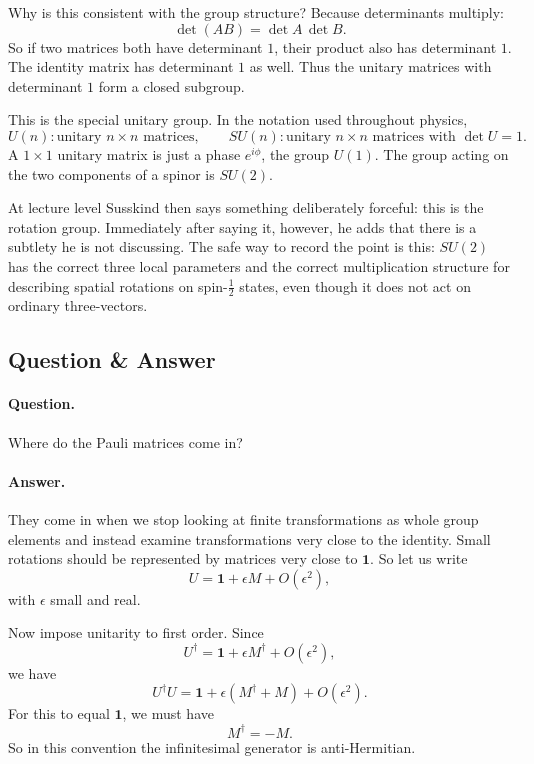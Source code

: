 Why is this consistent with the group structure? Because determinants multiply:
\begin{equation}
\det(AB)=\det A\,\det B.
\end{equation}
So if two matrices both have determinant \(1\), their product also has determinant \(1\). The identity matrix has determinant \(1\) as well. Thus the unitary matrices with determinant \(1\) form a closed subgroup.

This is the special unitary group. In the notation used throughout physics,
\begin{equation}
U(n): \text{unitary } n\times n \text{ matrices}, \qquad
SU(n): \text{unitary } n\times n \text{ matrices with } \det U=1.
\end{equation}
A \(1\times 1\) unitary matrix is just a phase \(e^{i\phi}\), the group \(U(1)\). The group acting on the two components of a spinor is \(SU(2)\).

At lecture level Susskind then says something deliberately forceful: this is the rotation group. Immediately after saying it, however, he adds that there is a subtlety he is not discussing. The safe way to record the point is this: \(SU(2)\) has the correct three local parameters and the correct multiplication structure for describing spatial rotations on spin-\(\frac12\) states, even though it does not act on ordinary three-vectors.

\subsection{Question \& Answer}

\paragraph{Question.} Where do the Pauli matrices come in?

\paragraph{Answer.} They come in when we stop looking at finite transformations as whole group elements and instead examine transformations very close to the identity. Small rotations should be represented by matrices very close to \(\mathbf 1\). So let us write
\begin{equation}
U=\mathbf 1+\epsilon M+O(\epsilon^2),
\end{equation}
with \(\epsilon\) small and real.

Now impose unitarity to first order. Since
\[
U^\dagger = \mathbf 1+\epsilon M^\dagger+O(\epsilon^2),
\]
we have
\begin{equation}
U^\dagger U
 = \mathbf 1+\epsilon(M^\dagger+M)+O(\epsilon^2).
\end{equation}
For this to equal \(\mathbf 1\), we must have
\begin{equation}
M^\dagger=-M.
\end{equation}
So in this convention the infinitesimal generator is anti-Hermitian.

